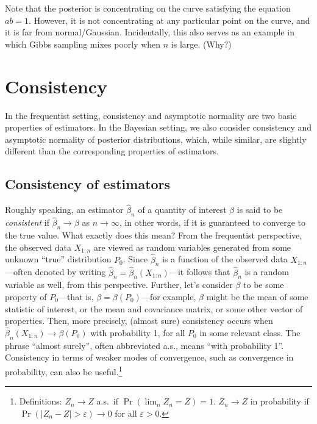 \documentclass[12pt]{article}
\begin{document}
Note that the posterior is concentrating on the curve satisfying the equation $a b = 1$. However, it is not concentrating at any particular point on the curve, and it is far from normal/Gaussian.
Incidentally, this also serves as an example in which Gibbs sampling mixes poorly when $n$ is large. (Why?)



\section{Consistency}

In the frequentist setting, consistency and asymptotic normality are two basic properties of estimators. In the Bayesian setting, we also consider consistency and asymptotic normality of posterior distributions, which, while similar, are slightly different than the corresponding properties of estimators.

\subsection{Consistency of estimators}

Roughly speaking, an estimator $\hat\beta_n$ of a quantity of interest $\beta$ is said to be \textit{consistent} if $\hat\beta_n \to \beta$ as $n\to\infty$, in other words, if it is guaranteed to converge to the true value. What exactly does this mean? From the frequentist perspective, the observed data $X_{1:n}$ are viewed as random variables generated from some unknown ``true'' distribution $P_0$.  Since $\hat\beta_n$ is a function of the observed data $X_{1:n}$---often denoted by writing $\hat\beta_n = \hat\beta_n(X_{1:n})$---it follows that $\hat\beta_n$ is a random variable as well, from this perspective.  Further, let's consider $\beta$ to be some property of $P_0$---that is, $\beta = \beta(P_0)$---for example, $\beta$ might be the mean of some statistic of interest, or the mean and covariance matrix, or some other vector of properties.  Then, more precisely, (almost sure) consistency occurs when $\hat\beta_n(X_{1:n}) \to \beta(P_0)$ with probability 1, for all $P_0$ in some relevant class. The phrase ``almost surely'', often abbreviated a.s., means ``with probability 1''. Consistency in terms of weaker modes of convergence, such as convergence in probability, can also be useful.\footnote{Definitions: $Z_n \to Z$ a.s.\ if $\Pr(\lim_n Z_n = Z) = 1$. $Z_n \to Z$ in probability if $\Pr(|Z_n - Z| >\varepsilon) \to 0$ for all $\varepsilon >0$.}
\end{document}
